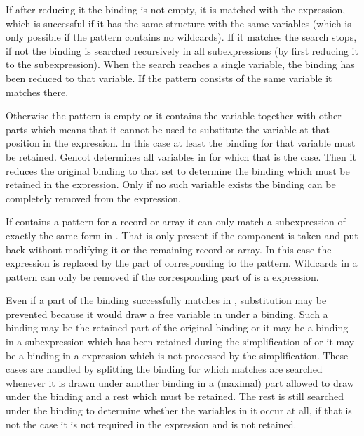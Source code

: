 If after reducing it the binding is not empty, it is matched with the expression, which is successful if it has the same structure with the same
variables (which is only possible if the pattern contains no wildcards). If it matches the search stops, if not the binding 
is searched recursively in all subexpressions (by first reducing it to the subexpression). When the search reaches a single 
variable, the binding has been reduced to that variable. If the pattern consists of the same variable it matches there.

Otherwise the pattern is empty or it contains the variable together with other parts which means that it cannot be used to substitute the 
variable at that position in the expression. In this case at least the binding for that variable must be retained. Gencot 
determines all variables in  for which that is the case. Then it reduces the original binding 
to that set to determine the binding  which must be retained in the  expression. Only if no
such variable exists the binding can be completely removed from the  expression.

If  contains a  pattern for a record or array it can only match a  subexpression 
of exactly the same form in . That is only present if the component is taken and put back without modifying it or the 
remaining record or array. In this case the  expression is replaced by the part of  corresponding to 
the  pattern. Wildcards in a  pattern can only be removed if the corresponding part of 
is a  expression.

Even if a part of the binding successfully matches in , substitution may be prevented because it would draw a 
free variable in  under a binding. Such a binding may be the retained part of the original binding or it may 
be a binding in a  subexpression which has been retained during the simplification of 
or it may be a binding in a  expression which is not processed by the simplification. These cases are handled
by splitting the binding for which matches are searched whenever it is drawn under another binding in a (maximal) part allowed
to draw under the binding and a rest which must be retained. The rest is still searched under the binding to determine whether
the variables in it occur at all, if that is not the case it is not required in the expression and is not retained.

